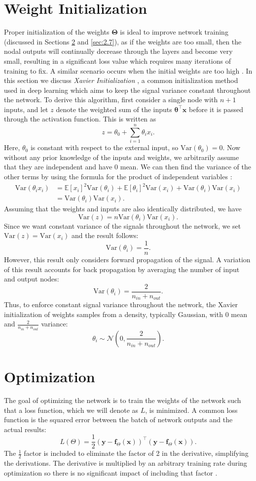 \documentclass[honours,12pt, twoside]{unswthesis}
\newcommand{\E}{\mathbb{E}}
\newcommand{\Var}{\mathrm{Var}}
\numberwithin{equation}{section}
\theoremstyle{definition}
\begin{document}
\section{Weight Initialization}\label{sec:2.5}
Proper initialization of the weights $\bm{\Theta}$ is ideal to improve network training (discussed in Sections \ref{sec:2.6} and \ref{sec:2.7}), as if the weights are too small, then the nodal outputs will continually decrease through the layers and become very small, resulting in a significant loss value which requires many iterations of training to fix. A similar scenario occurs when the initial weights are too high \citep{bishop}. In this section we discuss \textit{Xavier Initialization} \citep{xavier}, a common initialization method used in deep learning which aims to keep the signal variance constant throughout the network. To derive this algorithm, first consider a single node with $n+1$ inputs, and let $z$ denote the weighted sum of the inputs $\bm{\theta}^\top\bm{x}$ before it is passed through the activation function. This is written as
\[z=\theta_0+\sum^n_{i=1}\theta_ix_i.\]
Here, $\theta_0$ is constant with respect to the external input, so $\Var(\theta_0)=0$. Now without any prior knowledge of the inputs and weights, we arbitrarily assume that they are independent and have 0 mean. We can then find the variance of the other terms by using the formula for the product of independent variables \citep{goodman}:
\begin{align*}
\Var(\theta_ix_i)&=\E[x_i]^2\Var(\theta_i)+\E[\theta_i]^2\Var(x_i)+\Var(\theta_i)\Var(x_i)\\
&=\Var(\theta_i)\Var(x_i).
\end{align*}
Assuming that the weights and inputs are also identically distributed, we have
\[\Var(z)=n\Var(\theta_i)\Var(x_i).\]
Since we want constant variance of the signals throughout the network, we set $\Var(z)=\Var(x_i)$ and the result follows:
\[\Var(\theta_i)=\frac1n.\]
However, this result only considers forward propagation of the signal. A variation of this result accounts for back propagation by averaging the number of input and output nodes:
\[\Var(\theta_i)=\frac{2}{n_{in}+n_{out}}.\]
Thus, to enforce constant signal variance throughout the network, the Xavier initialization of weights samples from a density, typically Gaussian, with $0$ mean and $\frac{2}{n_{in}+n_{out}}$ variance:
\[\theta_i\sim \mathcal{N}\left(0,\frac{2}{n_{in}+n_{out}}\right).\]
\section{Optimization}\label{sec:2.6}
The goal of optimizing the network is to train the weights of the network such that a loss function, which we will denote as $L$, is minimized. A common loss function is the squared error between the batch of network outputs and the actual results:
\[L(\Theta)=\frac12 (\bm{y}-\bm{f}_\Theta(\bm{x}))^\top(\bm{y}-\bm{f}_\Theta(\bm{x})).\]
The $\frac12$ factor is included to eliminate the factor of 2 in the derivative, simplifying the derivations. The derivative is multiplied by an arbitrary training rate during optimization so there is no significant impact of including that factor \citep{DeepLearning}.
\end{document}
